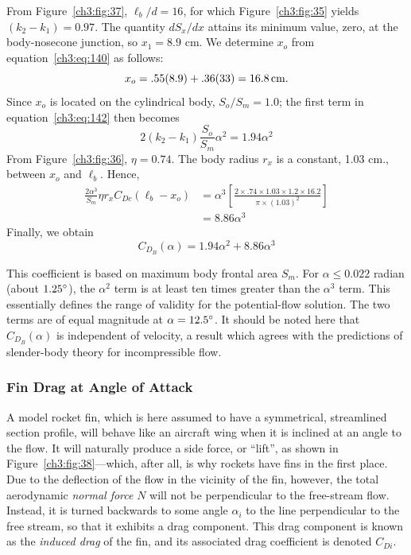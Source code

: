 From Figure~\ref{ch3:fig:37}, $\ell_b/d = 16$, for which
Figure~\ref{ch3:fig:35} yields $(k_2 - k_1) = 0.97$. The quantity $dS_x/dx$
attains its minimum value, zero, at the body-nosecone junction, so
$x_1 = 8.9$ cm. We determine $x_o$ from equation~\eqref{ch3:eq:140} as follows:
\begin{equation*}
x_o = .55(8.9) + .36(33) = 16.8\,\mathrm{cm.}
\end{equation*}
Since $x_o$ is located on the cylindrical body, $S_o/S_m = 1.0$; the first term
in equation~\eqref{ch3:eq:142} then becomes
\begin{equation*}
2(k_2 - k_1)\frac{S_o}{S_m}\alpha^2 = 1.94\alpha^2
\end{equation*}
From Figure~\ref{ch3:fig:36}, $\eta = 0.74$. The body radius $r_x$ is a
constant, 1.03 cm., between $x_o$ and $\ell_b$. Hence,
\begin{align*}
\frac{2\alpha^3}{S_m}\eta r_x C_{Dc}(\ell_b - x_o)
  &= \alpha^3\left[\frac{2\times .74\times 1.03\times 1.2\times 16.2}
     {\pi\times(1.03)^2}\right]\\
  &= 8.86\alpha^3
\end{align*}
Finally, we obtain
\begin{equation}\label{ch3:eq:144}
C_{D_B}(\alpha) = 1.94\alpha^2 + 8.86\alpha^3
\end{equation}

This coefficient is based on maximum body frontal area $S_m$. For
$\alpha \le 0.022$ radian (about $1.25^{\circ}$), the $\alpha^2$ term is at least
ten times greater than the $\alpha^3$ term. This essentially defines the range
of validity for the potential-flow solution. The two terms are of equal
magnitude at $\alpha = 12.5^{\circ}$. It should be noted here that
$C_{D_B}(\alpha)$ is independent of velocity, a result which agrees with the
predictions of slender-body theory for incompressible flow.

\subsubsection{Fin Drag at Angle of Attack}\label{ch3:sec:5.2.2}

A model rocket fin, which is here assumed to have a symmetrical, streamlined
section profile, will behave like an aircraft wing when it is inclined at an
angle to the flow. It will naturally produce a side force, or ``lift'', as
shown in Figure~\ref{ch3:fig:38}---which, after all, is why rockets have fins in
the first place. Due to the deflection of the flow in the vicinity of the fin,
however, the total aerodynamic \emph{normal force} $N$ will not be
perpendicular to the free-stream flow. Instead, it is turned backwards to some
angle $\alpha_i$ to the line perpendicular to the free stream, so that it
exhibits a drag component. This drag component is known as the \emph{induced
drag} of the fin, and its associated drag coefficient is denoted $C_{Di}$.

